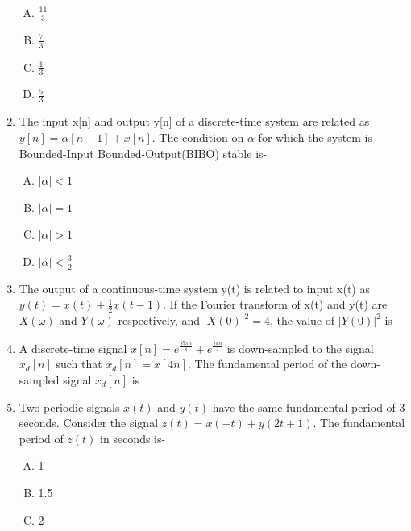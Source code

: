 \documentclass[journal,12pt,twocolumn]{IEEEtran}
\begin{document}
\begin{enumerate}
\begin{enumerate}[(A)]
\setlength\itemsep{0.5em}

\item $\frac{11}{3}$
\item $\frac{7}{3}$

\item $\frac{1}{3}$

\item $\frac{5}{3}$

\end{enumerate}
\item The input x[n] and output y[n] of a discrete-time system are related as $y[n]=\alpha[n-1]+x[n]$. The condition on $\alpha$ for which the system is Bounded-Input Bounded-Output(BIBO) stable is-
\begin{enumerate}[(A)]

\setlength\itemsep{0.5em}

\item $|\alpha|< 1$
\item $|\alpha|=1$

\item $|\alpha|>1$

\item $|\alpha|< \frac{3}{2}$

\end{enumerate}
\item The output of a continuous-time system y(t) is related to input x(t) as $y(t)=x(t)+\frac{1}{2}x(t-1)$. If the Fourier transform of x(t) and y(t) are $X(\omega)$ and $Y(\omega)$ respectively, and $|X(0)|^2=4$, the value of $|Y(0)|^2$ is \underline{\hspace{2cm}}

\item A discrete-time signal $x[n]=e^{\frac{j5\pi n}{8}}+e^{\frac{j\pi n}{4}}$ is down-sampled to the signal $x_d[n]$ such that  $x_d[n] =x[4n]$. The fundamental period of the down-sampled signal $x_d[n]$ is \underline{\hspace{2cm}}

\item Two periodic signals $x(t)$ and $y(t)$ have the same fundamental period of 3 seconds. Consider the signal $z(t)=x(-t)+y(2t+1)$. The fundamental period of $z(t)$ in seconds is- 
\begin{enumerate}[(A)]

\setlength\itemsep{0.5em}

\item 1
\item 1.5

\item 2


\end{enumerate}
\end{enumerate}
\end{document}

